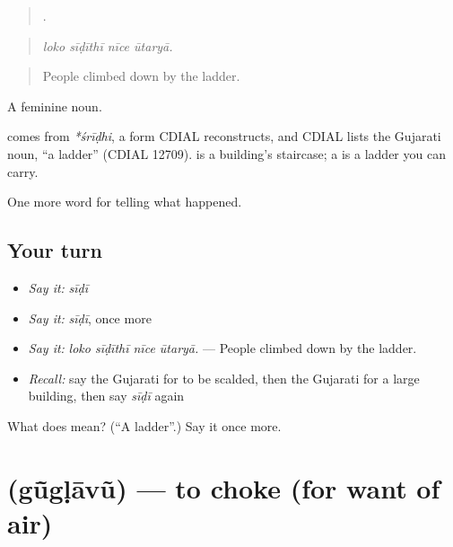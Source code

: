 \begin{quote}
   .
\end{quote}

\begin{quote}
\emph{loko sīḍīthī nīce ūtaryā.}
\end{quote}

\begin{quote}
People climbed down by the ladder.
\end{quote}

A feminine noun.

\begin{cousinweb}
comes from \emph{*śrīḍhi}, a form CDIAL reconstructs, and CDIAL lists the Gujarati noun, \textquotedblleft{}a ladder\textquotedblright{} (CDIAL 12709). \textbf{} is a building's staircase; a \textbf{} is a ladder you can carry.
\end{cousinweb}

\begin{grammarlens}[title={What you've built}]
One more word for telling what happened.
\end{grammarlens}

\subsection*{Your turn}
\begin{itemize}
\raggedright
  \item \emph{Say it:} \emph{sīḍī}
  \item \emph{Say it:} \emph{sīḍī}, once more
  \item \emph{Say it:} \emph{loko sīḍīthī nīce ūtaryā.} — People climbed down by the ladder.
  \item \emph{Recall:} say the Gujarati for to be scalded, then the Gujarati for a large building, then say \emph{sīḍī} again
\end{itemize}

\begin{tcolorbox}[breakable,colback=teal!4,colframe=teal!35!black,title={Before you move on}]
What does  mean? (\textquotedblleft{}A ladder\textquotedblright{}.) Say it once more.
\end{tcolorbox}
\section[\texorpdfstring{\gu{ગૂંગળાવું} (gū̃gḷāvũ)}{ગૂંગળાવું (gū̃gḷāvũ)}]{ (gū̃gḷāvũ) — to choke (for want of air)}

